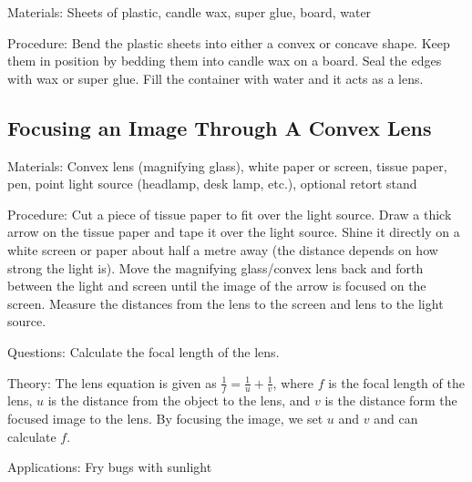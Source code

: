 \begin{multicols}{2}
\begin{description*}
\item[Materials:]{Sheets of plastic, candle wax, super glue, board, water}
\item[Procedure:]{Bend the plastic sheets into either a convex or concave shape. Keep them in position by bedding them into candle wax on a board. Seal the edges with wax or super glue. Fill the container with water and it acts as a lens.}
\end{description*}

\subsection{Focusing an Image Through A Convex Lens}


\begin{description*}
\item[Materials:]{Convex lens (magnifying glass), white paper or screen, tissue paper, pen, point light source (headlamp, desk lamp, etc.), optional retort stand}
\item[Procedure:]{Cut a piece of tissue paper to fit over the light source. Draw a thick arrow on the tissue paper and tape it over the light source. Shine it directly on a white screen or paper about half a metre away (the distance depends on how strong the light is). Move the magnifying glass/convex lens back and forth between the light and screen until the image of the arrow is focused on the screen. Measure the distances from the lens to the screen and lens to the light source.}
\item[Questions:]{Calculate the focal length of the lens.}
\item[Theory:]{The lens equation is given as $\frac{1}{f} = \frac{1}{u} + \frac{1}{v}$, where $f$ is the focal length of the lens, $u$ is the distance from the object to the lens, and $v$ is the distance form the focused image to the lens. By focusing the image, we set $u$ and $v$ and can calculate $f$. }
\item[Applications:]{Fry bugs with sunlight}
\end{description*}


\end{multicols}
